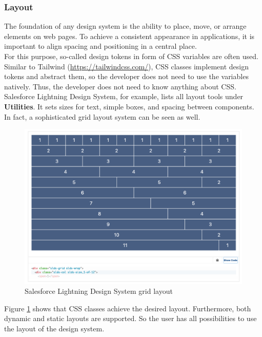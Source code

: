 \subsubsection{Layout}
The foundation of any design system is the ability to place, move, or arrange elements on web pages. To achieve a consistent appearance in applications, it is important to align spacing and positioning in a central place. \\ 
For this purpose, so-called design tokens in form of CSS variables are often used. Similar to Tailwind (\url{https://tailwindcss.com/}), CSS classes implement design tokens and abstract them, so the developer does not need to use the variables natively. Thus, the developer does not need to know anything about CSS.  \\
Salesforce Lightning Design System, for example, lists all layout tools under \textbf{Utilities}. It sets sizes for text, simple boxes, and spacing between components. In fact, a sophisticated grid layout system can be seen as well. \\
\begin{figure}[hbtp]
	\centerline{\includegraphics[width=\linewidth]{images/salesforce_lightning_layout.png}}
	\caption{Salesforce Lightning Design System grid layout \cite{lightning_design_system_lightning_nodate}}
	\label{salesforce_lightning_layout}
\end{figure} 

Figure \ref{salesforce_lightning_layout} shows that CSS classes achieve the desired layout. Furthermore, both dynamic and static layouts are supported. So the user has all possibilities to use the layout of the design system.\\


